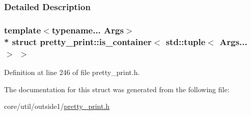 \subsubsection{Detailed Description}
\subsubsection*{template$<$typename... Args$>$\\*
struct pretty\+\_\+print\+::is\+\_\+container$<$ std\+::tuple$<$ Args... $>$ $>$}



Definition at line 246 of file pretty\+\_\+print.\+h.



The documentation for this struct was generated from the following file\+:\begin{DoxyCompactItemize}
\item 
core/util/outside1/\hyperlink{pretty__print_8h}{pretty\+\_\+print.\+h}\end{DoxyCompactItemize}
